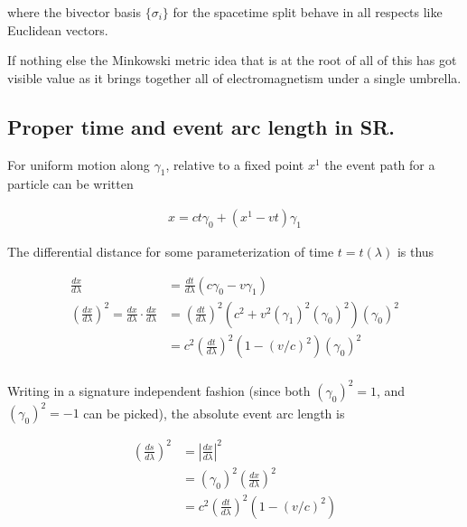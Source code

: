 \documentclass{article}      %
\newcommand{\Abs}[1]{\left\lvert{#1}\right\rvert}
\begin{document}
where the bivector basis $\{\sigma_i\}$ for the spacetime split behave in all respects like Euclidean vectors.

If nothing else the Minkowski metric idea that is at the root of all of this has got visible value as it brings together all
of electromagnetism under a single umbrella.

\subsection{ Proper time and event arc length in SR. }

For uniform motion along $\gamma_1$, relative to a fixed point $x^1$ the event path for a particle can be written

\begin{align*}
x = c t \gamma_0 + (x^1 - v t) \gamma_1
\end{align*}

The differential distance for some parameterization of time $t = t(\lambda)$ is thus

\begin{align*}
\frac{dx}{d\lambda} &= \frac{dt}{d\lambda} \left( c \gamma_0 - v \gamma_1 \right) \\
\left({\frac{dx}{d\lambda}}\right)^2 = {\frac{dx}{d\lambda}} \cdot {\frac{dx}{d\lambda}} 
&= \left(\frac{dt}{d\lambda}\right)^2 \left( c^2 + v^2 (\gamma_1)^2 (\gamma_0)^2 \right) (\gamma_0)^2 \\
&= c^2 \left(\frac{dt}{d\lambda}\right)^2 \left( 1 - (v/c)^2 \right) (\gamma_0)^2 \\
\end{align*}

Writing in a signature independent fashion (since both $(\gamma_0)^2 = 1$, and $(\gamma_0)^2 = -1$ can be picked), the absolute 
event arc length is

\begin{align*}
\left(\frac{ds}{d\lambda}\right)^2 &= \Abs{\frac{dx}{d\lambda}}^2  \\
&= (\gamma_0)^2 \left( {\frac{dx}{d\lambda}} \right)^2 \\
&= c^2 \left(\frac{dt}{d\lambda}\right)^2 \left( 1 - (v/c)^2 \right) \\
\end{align*}

%
\end{document}
